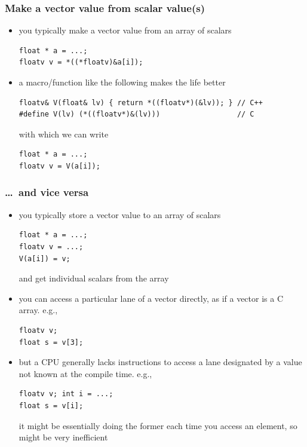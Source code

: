 \documentclass[12pt,dvipdfmx]{beamer}
\begin{document}
\begin{frame}[fragile]
  \frametitle{Make a vector value from scalar value(s)}
  \begin{itemize}
\item you typically make a vector value from an array of scalars
\begin{lstlisting}
float * a = ...;
floatv v = *((*floatv)&a[i]);
\end{lstlisting}
\item a macro/function like the following makes the life better
\begin{lstlisting}
floatv& V(float& lv) { return *((floatv*)(&lv)); } // C++
#define V(lv) (*((floatv*)&(lv)))                  // C
\end{lstlisting}
with which we can write
\begin{lstlisting}
float * a = ...;
floatv v = V(a[i]);
\end{lstlisting}
\end{itemize}
\end{frame}

\begin{frame}[fragile]
  \frametitle{\ldots\ and vice versa}
  \begin{itemize}
  \item you typically store a vector value to an array of scalars
\begin{lstlisting}
float * a = ...;
floatv v = ...;
V(a[i]) = v;
\end{lstlisting}
and get individual scalars from the array
    
\item you can access a particular lane of a vector directly,
  as if a vector is a C array. e.g.,
\begin{lstlisting}
floatv v;
float s = v[3];
\end{lstlisting}
\item but a CPU generally lacks instructions to access a lane designated by a value not known at the compile time. e.g.,
\begin{lstlisting}
floatv v; int i = ...;
float s = v[i];
\end{lstlisting}
it might be essentially doing the former each time you access an element, so might be very inefficient
  \end{itemize}
\end{frame}

\end{document}
